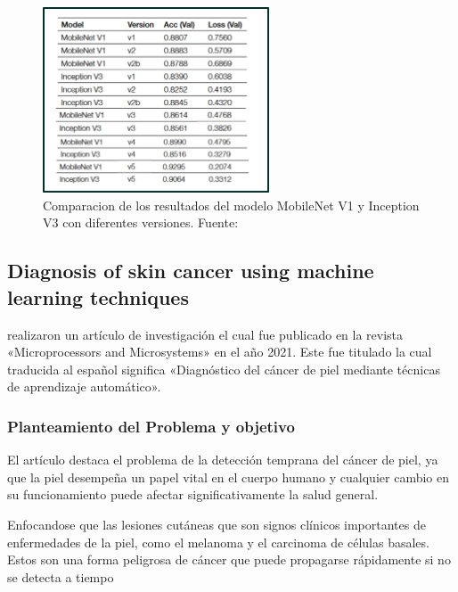 \begin{figure}[h]
	\begin{center}
		\includegraphics[width=0.6\textwidth]{2/figuras/Design_tool_the_classification_imagen_01.png}
		\caption{Comparacion de los resultados del modelo MobileNet V1 y Inception V3 con diferentes versiones. Fuente: \cite{vargas_2021diseno}}
		\label{1:fig}
	\end{center}
\end{figure}





\subsection{Diagnosis of skin cancer using machine learning techniques \citep*{murugan_2021diagnosis}}

\citeauthor{murugan_2021diagnosis} realizaron un artículo de investigación el cual fue publicado en la revista «Microprocessors and Microsystems» en el año 2021. Este fue titulado  la cual traducida al español significa «Diagnóstico del cáncer de piel mediante técnicas de aprendizaje automático».



\subsubsection{Planteamiento del Problema y objetivo}
 El artículo destaca el problema de la detección temprana del cáncer de piel, ya que la piel desempeña un papel vital en el cuerpo humano y cualquier cambio en su funcionamiento puede afectar significativamente la salud general.

Enfocandose que las lesiones cutáneas que son signos clínicos importantes de enfermedades de la piel, como el melanoma y el carcinoma de células basales. Estos son una forma peligrosa de cáncer que puede propagarse rápidamente si no se detecta a tiempo

